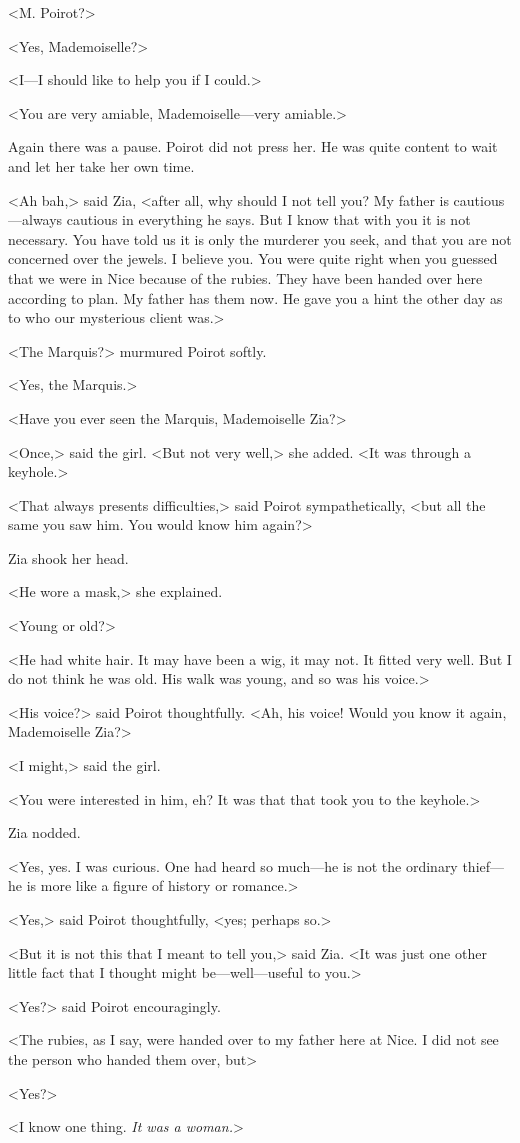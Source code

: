 <M. Poirot?>

<Yes, Mademoiselle?>

<I—I should like to help you if I could.>

<You are very amiable, Mademoiselle—very amiable.>

Again there was a pause. Poirot did not press her. He was quite content to wait and let her take her own time.

<Ah bah,> said Zia, <after all, why should I not tell you? My father is cautious—always cautious in everything he says. But I know that with you it is not necessary. You have told us it is only the murderer you seek, and that you are not concerned over the jewels. I believe you. You were quite right when you guessed that we were in Nice because of the rubies. They have been handed over here according to plan. My father has them now. He gave you a hint the other day as to who our mysterious client was.>

<The Marquis?> murmured Poirot softly.

<Yes, the Marquis.>

<Have you ever seen the Marquis, Mademoiselle Zia?>

<Once,> said the girl. <But not very well,> she added. <It was through a keyhole.>

<That always presents difficulties,> said Poirot sympathetically, <but all the same you saw him. You would know him again?>

Zia shook her head.

<He wore a mask,> she explained.

<Young or old?>

<He had white hair. It may have been a wig, it may not. It fitted very well. But I do not think he was old. His walk was young, and so was his voice.>

<His voice?> said Poirot thoughtfully. <Ah, his voice! Would you know it again, Mademoiselle Zia?>

<I might,> said the girl.

<You were interested in him, eh? It was that that took you to the keyhole.>

Zia nodded.

<Yes, yes. I was curious. One had heard so much—he is not the ordinary thief—he is more like a figure of history or romance.>

<Yes,> said Poirot thoughtfully, <yes; perhaps so.>

<But it is not this that I meant to tell you,> said Zia. <It was just one other little fact that I thought might be—well—useful to you.>

<Yes?> said Poirot encouragingly.

<The rubies, as I say, were handed over to my father here at Nice. I did not see the person who handed them over, but\longdash>

<Yes?>

<I know one thing. \emph{It was a woman.}>